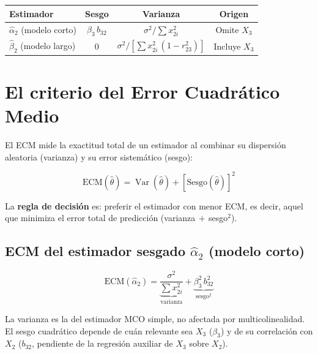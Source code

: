 \documentclass[12pt, letterpaper]{article}
\newcommand{\Var}{\operatorname{Var}}
\begin{document}
\begin{center}
\renewcommand{\arraystretch}{1.3}
\small
\begin{tabular}{lccc}
\toprule
\textbf{Estimador} & \textbf{Sesgo} & \textbf{Varianza} & \textbf{Origen} \\
\midrule
$\hat{\alpha}_2$ (modelo corto) & $\beta_3\,b_{32}$ & $\sigma^2/\sum x_{2i}^2$ & Omite $X_3$ \\
$\hat{\beta}_2$ (modelo largo)  & $0$               & $\sigma^2/[\sum x_{2i}^2\,(1-r_{23}^2)]$ & Incluye $X_3$ \\
\bottomrule
\end{tabular}
\end{center}

\section{El criterio del Error Cuadrático Medio}

El ECM mide la exactitud total de un estimador al combinar su dispersión
aleatoria (varianza) y su error sistemático (sesgo):

\begin{equation}
  \mathrm{ECM}(\hat{\theta})
  = \Var(\hat{\theta}) + [\mathrm{Sesgo}(\hat{\theta})]^2
\end{equation}

La \textbf{regla de decisión} es: preferir el estimador con menor ECM, es
decir, aquel que minimiza el error total de predicción
(varianza$\,+\,$sesgo$^2$).

\subsection{ECM del estimador sesgado $\hat{\alpha}_2$ (modelo corto)}

\begin{equation}
  \mathrm{ECM}(\hat{\alpha}_2)
  = \underbrace{\frac{\sigma^2}{\sum x_{2i}^2}}_{\text{varianza}}
  + \underbrace{\beta_3^2\,b_{32}^2}_{\text{sesgo}^2}
\end{equation}

La varianza es la del estimador MCO simple, no afectada por multicolinealidad.
El sesgo cuadrático depende de cuán relevante sea $X_3$ ($\beta_3$) y de su
correlación con $X_2$ ($b_{32}$, pendiente de la regresión auxiliar de $X_3$
sobre $X_2$).
\end{document}

